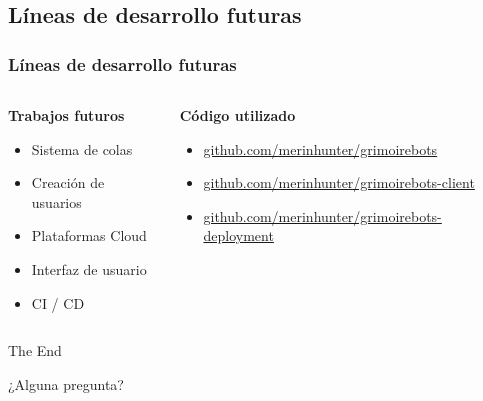 \documentclass[
	11pt, %
	aspectratio=169, %
]{beamer}
\begin{document}

\subsection[]{Líneas de desarrollo futuras}

\begin{frame}
	\frametitle{Líneas de desarrollo futuras}

	\begin{columns}[c] %
		\begin{column}{0.45\textwidth} %
			\textbf{Trabajos futuros}
			\begin{itemize}
				\item Sistema de colas
				\item Creación de usuarios
				\item Plataformas Cloud
				\item Interfaz de usuario
				\item CI / CD
			\end{itemize}
		\end{column}
		\begin{column}{0.5\textwidth} %
			\textbf{Código utilizado}
			\begin{itemize}
				\item \url{github.com/merinhunter/grimoirebots}
				\item \url{github.com/merinhunter/grimoirebots-client}
				\item \url{github.com/merinhunter/grimoirebots-deployment}
			\end{itemize}
		\end{column}
	\end{columns}
\end{frame}


\begin{frame}[plain] %
	\begin{center}
		{\Huge The End}

		\bigskip\bigskip %

		{\LARGE ¿Alguna pregunta?}
	\end{center}
\end{frame}

\end{document}
